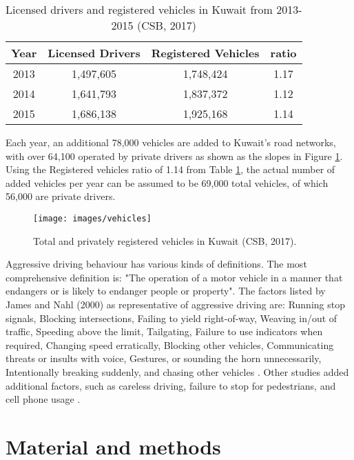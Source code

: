 \documentclass[preprint,12pt,a4paper,authoryear]{elsarticle}
\begin{document}
\begin{table}[H]
\centering
\caption{Licensed drivers and registered vehicles in Kuwait from 2013-2015 (CSB, 2017)}
\label{tb:drivers}
\begin{tabular}{@{}cccc@{}}
\toprule
\textbf{Year} & \textbf{Licensed Drivers} & \textbf{Registered Vehicles} & \textbf{ratio} \\ \midrule
2013 & 1,497,605 & 1,748,424 & 1.17 \\
2014 & 1,641,793 & 1,837,372 & 1.12 \\
2015 & 1,686,138 & 1,925,168 & 1.14 \\ \bottomrule
\end{tabular}
\end{table}

Each year, an additional 78,000 vehicles are added to Kuwait's road networks, with over 64,100 operated by private drivers as shown as the slopes in Figure \ref{fig:regvehicles}. Using the Registered vehicles ratio of 1.14 from Table \ref{tb:drivers}, the actual number of added vehicles per year can be assumed to be 69,000 total vehicles, of which 56,000 are private drivers.

\begin{figure}[H]
\centering
\texttt{[image: images/vehicles]}  %
\caption{Total and privately registered vehicles in Kuwait (CSB, 2017).}
\label{fig:regvehicles}
\end{figure}
%

Aggressive driving behaviour has various kinds of definitions. The most comprehensive definition is: "The operation of a motor vehicle in a manner that endangers or is likely to endanger people or property".  The factors listed by James and Nahl (2000) as representative of aggressive driving are: Running stop signals, Blocking intersections, Failing to yield right-of-way, Weaving in/out of traffic, Speeding above the limit, Tailgating, Failure to use indicators when required, Changing speed erratically, Blocking other vehicles, Communicating threats or insults with voice, Gestures, or sounding the horn unnecessarily, Intentionally breaking suddenly, and chasing other vehicles  \citep{James2000}. Other studies added additional factors, such as careless driving, failure to stop for pedestrians, and cell phone usage  \citep{Stephens2016}.

\section{Material and methods}
\end{document}
